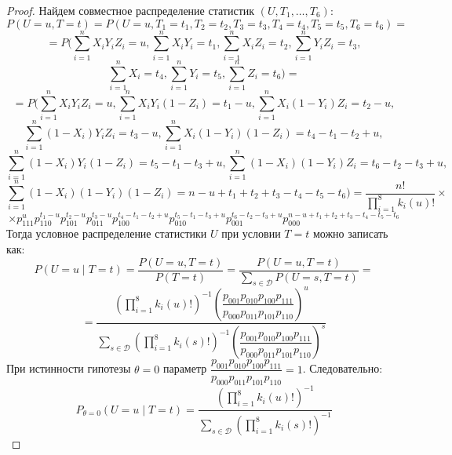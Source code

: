     \begin{proof}
        Найдем совместное распределение статистик $(U,T_1,\ldots,T_6)$:
        $$
            P(U=u,T=t)=P(U=u, T_1=t_1, T_2=t_2, T_3=t_3, T_4=t_4, T_5=t_5, T_6=t_6)=
        $$
        $$
            =P\biggl(\sum_{i=1}^n X_i Y_i Z_i=u, \sum_{i=1}^n X_i Y_i=t_1, \sum_{i=1}^n X_i Z_i=t_2,\sum_{i=1}^n Y_i Z_i=t_3,
            $$
            $$
            \sum_{i=1}^n X_i=t_4,\sum_{i=1}^n Y_i=t_5, \sum_{i=1}^n Z_i=t_6\biggr)=
        $$
        $$
            =P\biggl(\sum_{i=1}^n X_i Y_i Z_i=u, \sum_{i=1}^n X_i Y_i (1- Z_i)=t_1-u, \sum_{i=1}^n X_i (1-Y_i) Z_i=t_2-u,
        $$
        $$
            \sum_{i=1}^n (1-X_i) Y_i Z_i=t_3-u,
            \sum_{i=1}^{n} X_i(1-Y_i)(1-Z_i)=t_4-t_1-t_2+u,
        $$
        $$
            \sum_{i=1}^{n} (1-X_i)Y_i(1-Z_i)=t_5-t_1-t_3+u,
            \sum_{i=1}^{n} (1-X_i)(1-Y_i)Z_i = t_6 - t_2 - t_3 + u,
        $$
        $$
            \sum_{i=1}^n (1-X_i)(1-Y_i)(1-Z_i)=n-u+t_1+t_2+t_3-t_4-t_5-t_6\biggr)
            = \frac{n!}{\prod_{i=1}^8 k_i(u)!} \times
        $$
        $$    
        \times p_{111}^u p_{110}^{t_1-u} p_{101}^{t_2-u} p_{011}^{t_3-u}
            p_{100}^{t_4-t_1-t_2+u} p_{010}^{t_5-t_1-t_3+u} p_{001}^{t_6 - t_2 - t_3 + u} 
            p_{000}^{n-u+t_1+t_2+t_3-t_4-t_5-t_6}
            $$
        Тогда условное распределение статистики $U$ при условии $T=t$ можно записать как:
        $$P(U=u \mid T=t)=\dfrac{P(U=u,T=t)}{P(T=t)}=
        \dfrac{P(U=u,T=t)}{\sum_{s \in \mathcal{D}} P(U=s,T=t)}=
        $$
        $$
        =\dfrac{(\prod_{i=1}^8 k_i(u)!)^{-1} \left(\dfrac{p_{001}p_{010}p_{100}p_{111}}{p_{000}p_{011}p_{101}p_{110}}\right)^u}
            {\sum_{s\in \mathcal{D}} (\prod_{i=1}^8 k_i(s)!)^{-1} \left(\dfrac{p_{001}p_{010}p_{100}p_{111}}{p_{000}p_{011}p_{101}p_{110}}\right)^s}$$
        При истинности гипотезы $\theta=0$ параметр $\dfrac{p_{001}p_{010}p_{100}p_{111}}{p_{000}p_{011}p_{101}p_{110}}=1$. Следовательно:
        $$P_{\theta=0}(U=u \mid T=t)=\dfrac{(\prod_{i=1}^8 k_i(u)!)^{-1}}
            {\sum_{s\in \mathcal{D}} (\prod_{i=1}^8 k_i(s)!)^{-1}}$$
    \end{proof}

